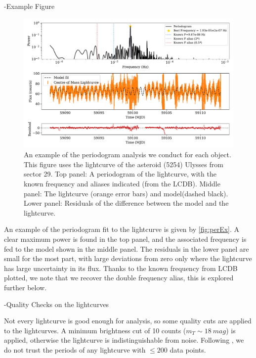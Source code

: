 \documentclass[12pt]{article}
\begin{document}
-Example Figure

\begin{figure}[!t]
    \centering
    \includegraphics[width=\textwidth]{PeriodogramUlyssesPaperFigDraft.pdf}
    \caption{An example of the periodogram analysis we conduct for each object. 
    This figure uses the lightcurve of the asteroid (5254) Ulysses from sector 29. 
    Top panel: A periodogram of the lightcurve, with the known frequency and aliases indicated (from the LCDB).
    Middle panel: The lightcurve (orange error bars) and model(dashed black). 
    Lower panel: Residuals of the difference between the model and the lightcurve.}
    \label{fig:perEx}
\end{figure}

An example of the periodogram fit to the lightcurve is given by \autoref{fig:perEx}. 
A clear maximum power is found in the top panel, and the associated frequency is fed to the model shown in the middle panel.
The residuals in the lower panel are small for the most part, with large deviations from zero only where the lightcurve has large uncertainty in its flux. 
Thanks to the known frequency from LCDB plotted, we note that we recover the double frequency alias, this is explored further below.   

-Quality Checks on the lightcurves

Not every lightcurve is good enough for analysis, so some quality cuts are applied to the lightcurves.
A minimum brightness cut of 10 counts ($m_T \sim \qty{18}{mag}$) %
is applied, otherwise the lightcurve is indistinguishable from noise. %
Following \citeauthor{McNeill2023}, we do not trust the periods of any lightcurve with $\leq 200$ data points.
\end{document}
